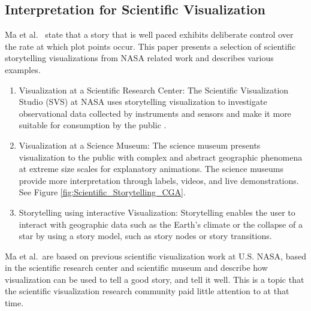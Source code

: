 \documentclass{egpubl}
\begin{document}
\subsection{Interpretation for Scientific Visualization}
Ma et al.\ \cite{sci} state that a story that is well paced exhibits deliberate control over the rate at which plot points occur.
This paper presents a selection of scientific storytelling visualizations from NASA related work and describes various examples.
\begin{enumerate}
\item Visualization at a Scientific Research Center: The Scientific Visualization Studio (SVS) at NASA uses storytelling visualization to investigate observational data collected by instruments and sensors and make it more suitable for consumption by the public \cite{nasa}\cite{svs1}.
\item Visualization at a Science Museum: The science museum presents visualization to the public with complex and abstract geographic phenomena at extreme size scales for explanatory animations. The science museums provide more interpretation through labels, videos, and live demonstrations. See Figure \ref{fig:Scientific_Storytelling_CGA}\cite{sci}.
\item Storytelling using interactive Visualization: Storytelling enables the user to interact with geographic data such as the Earth's climate or the collapse of a star by using a story model, such as story nodes or story transitions\cite{Akiba}.
\end{enumerate}
Ma et al.\ are based on previous scientific visualization work at U.S. NASA, based in the scientific research center and scientific museum and describe how  visualization can be used to tell a good story, and tell it well. This is a topic that the scientific visualization research community paid little attention to at that time.
\end{document}
